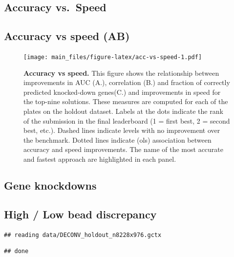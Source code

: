 \documentclass[]{article}
\begin{document}
\hypertarget{accuracy-vs.-speed}{%
\subsection{Accuracy vs.~Speed}\label{accuracy-vs.-speed}}

\hypertarget{accuracy-vs-speed-ab}{%
\subsection{Accuracy vs speed (AB)}\label{accuracy-vs-speed-ab}}

\begin{figure}
\centering
\texttt{[image: main\_files/figure-latex/acc-vs-speed-1.pdf]}
\caption{\label{fig:acc-vs-speed}\textbf{Accuracy vs speed.} This figure
shows the relationship between improvements in AUC (A.), correlation
(B.) and fraction of correctly predicted knocked-down genes(C.) and
improvements in speed for the top-nine solutions. These measures are
computed for each of the plates on the holdout dataset. Labels at the
dots indicate the rank of the submission in the final leaderboard (1 =
first best, 2 = second best, etc.). Dashed lines indicate levels with no
improvement over the benchmark. Dotted lines indicate (ols) association
between accuracy and speed improvements. The name of the most accurate
and fastest approach are highlighted in each panel.}
\end{figure}

\hypertarget{gene-knockdowns}{%
\subsection{Gene knockdowns}\label{gene-knockdowns}}

\hypertarget{high-low-bead-discrepancy}{%
\subsection{High / Low bead
discrepancy}\label{high-low-bead-discrepancy}}

\begin{verbatim}
## reading data/DECONV_holdout_n8228x976.gctx
\end{verbatim}

\begin{verbatim}
## done
\end{verbatim}
\end{document}
